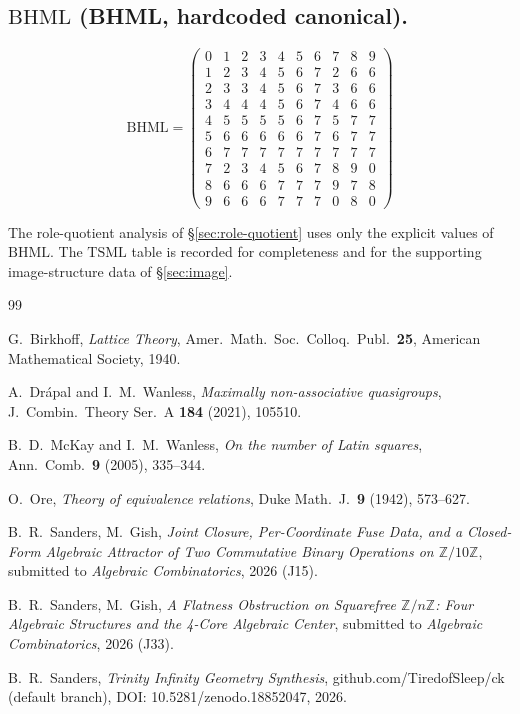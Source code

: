 \documentclass[11pt,reqno]{amsart}
\theoremstyle{plain}
\theoremstyle{definition}
\theoremstyle{remark}
\newcommand{\Z}{\mathbb{Z}}
\newcommand{\TS}{\mathrm{TSML}}
\newcommand{\BH}{\mathrm{BHML}}
\begin{document}
\subsection*{$\BH$ (BHML, hardcoded canonical).}

\[
\BH =
\begin{pmatrix}
0 & 1 & 2 & 3 & 4 & 5 & 6 & 7 & 8 & 9 \\
1 & 2 & 3 & 4 & 5 & 6 & 7 & 2 & 6 & 6 \\
2 & 3 & 3 & 4 & 5 & 6 & 7 & 3 & 6 & 6 \\
3 & 4 & 4 & 4 & 5 & 6 & 7 & 4 & 6 & 6 \\
4 & 5 & 5 & 5 & 5 & 6 & 7 & 5 & 7 & 7 \\
5 & 6 & 6 & 6 & 6 & 6 & 7 & 6 & 7 & 7 \\
6 & 7 & 7 & 7 & 7 & 7 & 7 & 7 & 7 & 7 \\
7 & 2 & 3 & 4 & 5 & 6 & 7 & 8 & 9 & 0 \\
8 & 6 & 6 & 6 & 7 & 7 & 7 & 9 & 7 & 8 \\
9 & 6 & 6 & 6 & 7 & 7 & 7 & 0 & 8 & 0
\end{pmatrix}
\]

The role-quotient analysis of \S\ref{sec:role-quotient} uses only
the explicit values of $\BH$. The $\TS$ table is recorded for
completeness and for the supporting image-structure data of
\S\ref{sec:image}.

\begin{thebibliography}{99}

 G.~Birkhoff,
\emph{Lattice Theory},
Amer.\ Math.\ Soc.\ Colloq.\ Publ.\ \textbf{25},
American Mathematical Society, 1940.

A.~Dr\'apal and I.~M.~Wanless,
\emph{Maximally non-associative quasigroups},
J.\ Combin.\ Theory Ser.\ A \textbf{184} (2021), 105510.

 B.~D.~McKay and I.~M.~Wanless,
\emph{On the number of Latin squares},
Ann.\ Comb.\ \textbf{9} (2005), 335--344.

 O.~Ore,
\emph{Theory of equivalence relations},
Duke Math.\ J.\ \textbf{9} (1942), 573--627.

 B.~R.~Sanders, M.~Gish,
\emph{Joint Closure, Per-Coordinate Fuse Data, and a Closed-Form
Algebraic Attractor of Two Commutative Binary Operations on
$\Z/10\Z$},
submitted to \emph{Algebraic Combinatorics}, 2026 (J15).

 B.~R.~Sanders, M.~Gish,
\emph{A Flatness Obstruction on Squarefree $\Z/n\Z$: Four Algebraic
Structures and the 4-Core Algebraic Center},
submitted to \emph{Algebraic Combinatorics}, 2026 (J33).

 B.~R.~Sanders,
\emph{Trinity Infinity Geometry Synthesis},
github.com/TiredofSleep/ck (default branch),
DOI: 10.5281/zenodo.18852047, 2026.

\end{thebibliography}
\end{document}
